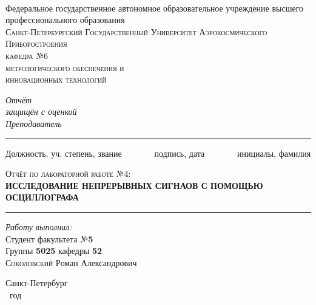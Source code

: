 \newcommand{\HRule}{\rule{\linewidth}{0.5mm}}
\begin{titlepage}
\begin{center}
\textsc{}\\
Федеральное государственное автономное образовательное учреждение
высшего профессионального образования\\[0.5 cm]

\textsc{\large Санкт-Петербургский Государственный
Университет Аэрокосмического Приборостроения}\\[1 cm]
\textsc{\large кафедра №6\\
метрологического обеспечения и\\
инновационных технологий}
\\[2cm]

 \begin{flushleft} \large
  \emph{Отчёт} \\
   \emph{защищён с оценкой}
   \\[0.5cm]
   \emph{Преподаватель}\\[-3mm]
   \HRule
\end{flushleft}
\begin{flushright}
\vspace{-6 pt}
{\small
Должность, уч. степень, звание
\ \ \ \ \ \ \
подпись, дата
\ \ \ \ \ \ \
инициалы, фамилия }\\[10mm]
\end{flushright}

\textsc{\Large Отчёт по лабораторной работе №4:} \\[1cm]
{\Large \bfseries ИССЛЕДОВАНИЕ НЕПРЕРЫВНЫХ СИГНАОВ
С ПОМОЩЬЮ ОСЦИЛЛОГРАФА}\\[1cm]

\HRule
\vspace{5 pt}
\begin{flushright}
    \begin{minipage}{0.5\textwidth}
        \begin{flushright} 
            \large
            \emph{Работу выполнил:}\\
            Студент факультета №\textbf{5}\\
            Группы \textbf{5025} кафедры \textbf{52}\\[2pt]
            \textsc{Соколовский} \textsc{Р}оман \textsc{А}лександрович
        \end{flushright}
    \end{minipage}
\end{flushright}

\vfill
Санкт-Петербург\\
\the\year~год
\end{center}
\end{titlepage}
